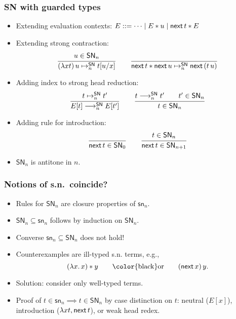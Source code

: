 \documentclass[t]{beamer}
\newcommand{\mybox}[1]{\mbox{\color{black}#1}}
\newcommand{\nex}{\tnext\,}
\newcommand{\contrSN}{\contr^\SN}
\newcommand{\redSN}{\red^\SN}
\renewcommand{\sn}{\mathsf{sn}}
\renewcommand{\SN}{\mathsf{SN}}
\begin{document}
\begin{frame}%
  \frametitle{SN with guarded types}
  \begin{itemize}
  \item Extending evaluation contexts:
\(
  E ::= \dots \mid E \ast u \mid \nex t \ast E
\)
  \item Extending strong contraction:
\[
  \ru{u \in \SN_n
    }{(\lambda x t)\,u \contrSN_n \subst u x t}
\qquad
  \ru{}{\nex t \ast \nex u \contrSN_n \nex (t\,u)}
\]
\vspace{-2ex}
  \item Adding index to strong head reduction:
\[
  \ru{t \contrSN_n t'}{E[t] \redSN_n E[t']}
\qquad
  \ru{t \redSN_n t' \qquad t' \in \SN_n
    }{t \in \SN_n}
\]
\vspace{-2ex}
  \item Adding rule for introduction:
\vspace{-2ex}
\[
  \ru{}{\nex t \in \SN_0}
\qquad
  \ru{t \in \SN_n
    }{\nex t \in \SN_{n+1}}
\]
\vspace{-2ex}
\item $\SN_n$ is antitone in $n$.
  \end{itemize}
\end{frame}


\begin{frame}%
  \frametitle{Notions of s.n.\ coincide?}
  \begin{itemize}
  \item Rules for $\SN_n$ are closure properties of $\sn_n$.
  \item $\SN_n \subseteq \sn_n$ follows by induction on $\SN_n$.
  \item Converse $\sn_n \subseteq \SN_n$ does not hold!
  \item Counterexamples are ill-typed s.n. terms, e.g.,
\[
  (\lambda x.\, x) \ast y
\qquad \mybox{or}\qquad
  (\nex x)\,y
.\]
  \item Solution: consider only well-typed terms.
  \item Proof of $t \in \sn_n \implies t \in \SN_n$ by case
    distinction on $t$: neutral ($E[x]$), introduction ($\lambda
    x t, \nex t$), or weak head redex.
  \end{itemize}
\end{frame}
\end{document}
